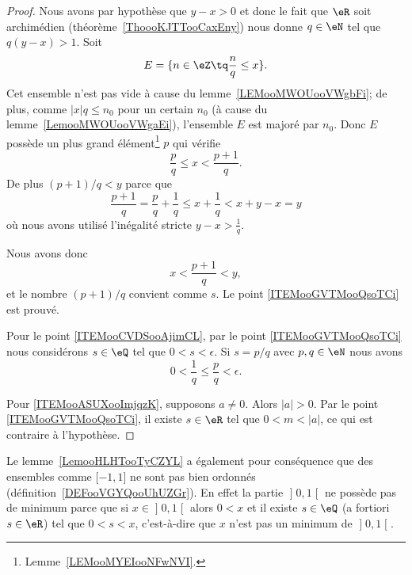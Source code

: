 \begin{proof}
	Nous avons par hypothèse que \( y-x>0\) et donc le fait que \( \eR\) soit archimédien (théorème~\ref{ThoooKJTTooCaxEny}) nous donne \( q\in \eN\) tel que \( q(y-x)>1\). Soit
	\begin{equation}
		E=\{ n\in \eZ\tq \frac{ n }{ q }\leq x \}.
	\end{equation}
	Cet ensemble n'est pas vide à cause du lemme~\ref{LEMooMWOUooVWgbFi}; de plus, comme \( |x|q \leq n_0\) pour un certain \( n_0 \) (à cause du lemme~\ref{LemooMWOUooVWgaEi}), l'ensemble \( E\) est majoré par \( n_0\). Donc \( E\) possède un plus grand élément\footnote{Lemme~\ref{LEMooMYEIooNFwNVI}.} \( p\) qui vérifie
	\begin{equation}
		\frac{ p }{ q }\leq x<\frac{ p+1 }{ q }.
	\end{equation}
	De plus \( (p+1)/q<y\) parce que
	\begin{equation}
		\frac{ p+1 }{ q }=\frac{ p }{ q }+\frac{1}{ q }\leq x+\frac{1}{ q }<x+y-x=y
	\end{equation}
	où nous avons utilisé l'inégalité stricte \( y-x>\frac{1}{ q }\).

	Nous avons donc
	\begin{equation}
		x<\frac{ p+1 }{ q }<y,
	\end{equation}
	et le nombre \( (p+1)/q\) convient comme \( s\). Le point \ref{ITEMooGVTMooQsoTCi} est prouvé.

	Pour le point \ref{ITEMooCVDSooAjimCL}, par le point \ref{ITEMooGVTMooQsoTCi} nous considérons \( s\in \eQ\) tel que \( 0<s<\epsilon\). Si \( s=p/q\) avec \( p,q\in \eN\) nous avons
	\begin{equation}
		0<\frac{1}{ q }\leq \frac{ p }{ q }<\epsilon.
	\end{equation}

	Pour \ref{ITEMooASUXooImjqzK}, supposons \( a\neq 0\). Alors \( | a |>0\). Par le point \ref{ITEMooGVTMooQsoTCi}, il existe \( s\in \eR\) tel que \(0<m<| a | \), ce qui est contraire à l'hypothèse.
\end{proof}

\begin{remark}      \label{REMooXOIOooHjwMvA}
	Le lemme~\ref{LemooHLHTooTyCZYL} a également pour conséquence que des ensembles comme \( \mathopen[ -1 , 1 \mathclose]\) ne sont pas bien ordonnés (définition~\ref{DEFooVGYQooUhUZGr}). En effet la partie \( \mathopen] 0 , 1 \mathclose[\) ne possède pas de minimum parce que si \( x\in \mathopen] 0 , 1 \mathclose[\) alors \( 0<x\) et il existe \( s\in \eQ\) (a fortiori \( s\in \eR\)) tel que \( 0<s<x\), c'est-à-dire que \( x\) n'est pas un minimum de \( \mathopen] 0 , 1 \mathclose[\).
\end{remark}

